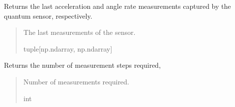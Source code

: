 \documentclass[letterpaper,10pt,english]{sphinxmanual}
\begin{document}
\begin{fulllineitems}
\begin{fulllineitems}
\end{fulllineitems}


\begin{fulllineitems}
\label{\detokenize{modules/quantum/base:qnav.quantum.base.ConceptQuantumImu.last_measurement}}
\pysigstartsignatures
{}
\pysigstopsignatures
\sphinxAtStartPar
Returns the last acceleration and angle rate measurements captured
by the quantum sensor, respectively.
\begin{quote}\begin{description}
\sphinxAtStartPar
The last measurements of the sensor.

\sphinxAtStartPar
tuple{[}np.ndarray, np.ndarray{]}

\end{description}\end{quote}

\end{fulllineitems}


\begin{fulllineitems}
\label{\detokenize{modules/quantum/base:qnav.quantum.base.ConceptQuantumImu.num_active_steps}}
\pysigstartsignatures
{}
\pysigstopsignatures
\sphinxAtStartPar
Returns the number of measurement steps required,
\begin{quote}\begin{description}
\sphinxAtStartPar
Number of measurements required.

\sphinxAtStartPar
int

\end{description}\end{quote}


\end{fulllineitems}
\end{fulllineitems}
\end{document}

